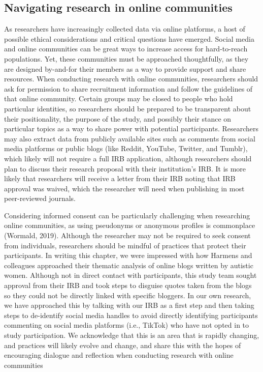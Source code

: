 \documentclass[
  11pt,
]{book}
\begin{document}
\subsection{Navigating research in online communities}\label{navigating-research-in-online-communities}

As researchers have increasingly collected data via online platforms, a host of possible ethical considerations and critical questions have emerged. Social media and online communities can be great ways to increase access for hard-to-reach populations. Yet, these communities must be approached thoughtfully, as they are designed by-and-for their members as a way to provide support and share resources. When conducting research with online communities, researchers should ask for permission to share recruitment information and follow the guidelines of that online community. Certain groups may be closed to people who hold particular identities, so researchers should be prepared to be transparent about their positionality, the purpose of the study, and possibly their stance on particular topics as a way to share power with potential participants. Researchers may also extract data from publicly available sites such as comments from social media platforms or public blogs (like Reddit, YouTube, Twitter, and Tumblr), which likely will not require a full IRB application, although researchers should plan to discuss their research proposal with their institution's IRB. It is more likely that researchers will receive a letter from their IRB noting that IRB approval was waived, which the researcher will need when publishing in most peer-reviewed journals.

Considering informed consent can be particularly challenging when researching online communities, as using pseudonyms or anonymous profiles is commonplace (Wormald, 2019). Although the researcher may not be required to seek consent from individuals, researchers should be mindful of practices that protect their participants. In writing this chapter, we were impressed with how Harmens and colleagues \citeyearpar{harmens_quest_2022} approached their thematic analysis of online blogs written by autistic women. Although not in direct contact with participants, this study team sought approval from their IRB and took steps to disguise quotes taken from the blogs so they could not be directly linked with specific bloggers. In our own research, we have approached this by talking with our IRB as a first step and then taking steps to de-identify social media handles to avoid directly identifying participants commenting on social media platforms (i.e., TikTok) who have not opted in to study participation. We acknowledge that this is an area that is rapidly changing, and practices will likely evolve and change, and share this with the hopes of encouraging dialogue and reflection when conducting research with online communities
\end{document}
